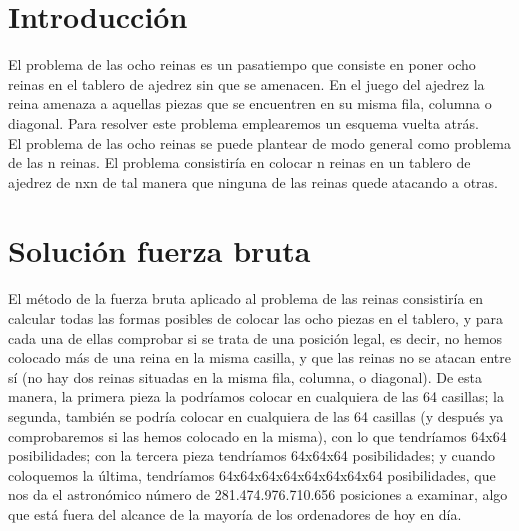 	\listoftables %
	
	\newpage
	
	\section[Introducción]{Introducción}
	
	El problema de las ocho reinas es un pasatiempo que consiste en poner ocho reinas en el tablero de ajedrez sin que se amenacen. En el juego del ajedrez la reina amenaza a aquellas piezas que se encuentren en su misma fila, columna o diagonal. Para resolver este problema emplearemos un esquema vuelta atrás. \\
	
	El problema de las ocho reinas se puede plantear de modo general como problema de las n reinas. El problema consistiría en colocar n reinas en un tablero de ajedrez de nxn de tal manera que ninguna de las reinas quede atacando a otras.
	
	\section[Solución fuerza bruta]{Solución fuerza bruta}
	
	El método de la fuerza bruta aplicado al problema de las reinas consistiría en calcular todas las formas posibles de colocar las ocho piezas en el tablero, y para cada una de ellas comprobar si se trata de una posición legal, es decir, no hemos colocado más de una reina en la misma casilla, y que las reinas no se atacan entre sí (no hay dos reinas situadas en la misma fila, columna, o diagonal). De esta manera, la primera pieza la podríamos colocar en cualquiera de las 64 casillas; la segunda, también se podría colocar en cualquiera de las 64 casillas (y después ya comprobaremos si las hemos colocado en la misma), con lo que tendríamos 64x64 posibilidades; con la tercera pieza tendríamos 64x64x64 posibilidades; y cuando coloquemos la última, tendríamos 64x64x64x64x64x64x64x64 posibilidades, que nos da el astronómico número de 281.474.976.710.656 posiciones a examinar, algo que está fuera del alcance de la mayoría de los ordenadores de hoy en día.\\
	
